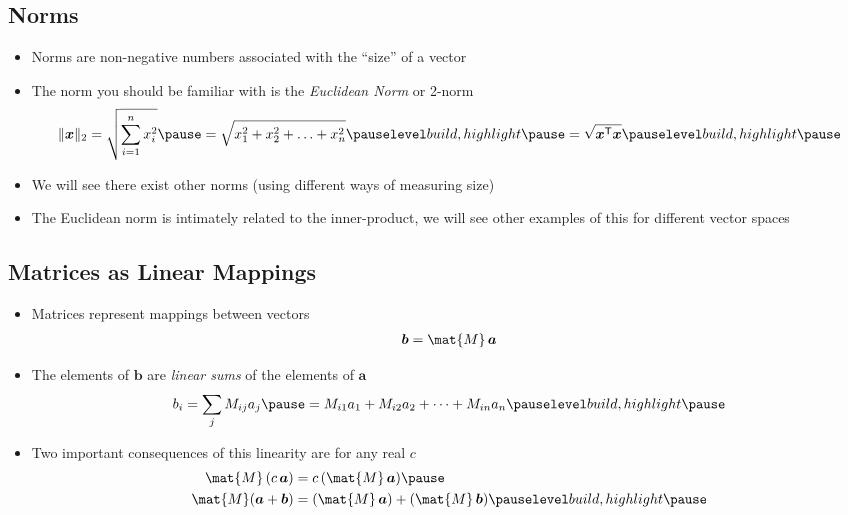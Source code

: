 \begin{slide}
\section[-2]{Norms}

\begin{PauseHighLight}
  \begin{itemize}
  \item Norms are non-negative numbers associated with the ``size'' of
    a vector\pause
  \item The norm you should be familiar with is the \emph{Euclidean
      Norm} or 2-norm
    \begin{align*}
      \|\bm{x}\|_2 = \sqrt{\sum_{i=1}^n x_i^2}\pause = \sqrt{x_1^2 +
      x_2^2 + \ldots + x_n^2}\pauseb = \sqrt{\bm{x}^\tr \bm{x}}\pauseb
    \end{align*}
  \item We will see there exist other norms (using different ways of
    measuring size)\pause
  \item The Euclidean norm is intimately related to the inner-product,
    we will see other examples of this for different vector spaces\pause
  \end{itemize}
\end{PauseHighLight}

\end{slide}


\begin{slide}
\section[-1]{Matrices as Linear Mappings}

\begin{PauseHighLight}
  \begin{itemize}
  \item Matrices represent mappings between vectors
    \begin{align*}
      \bm{b} = \mat{M}\, \bm{a} 
    \end{align*}
  \item The elements of $\bm{b}$ are \emph{linear sums} of the elements of
    $\bm{a}$
    \begin{align*}
      b_i = \sum_j M_{ij} a_j\pause = M_{i1} a_1 + M_{i2} a_2 + \cdots + M_{in} a_n\pauseb
    \end{align*}
  \item Two important consequences of this linearity are for any real
    $c$
    \begin{align*}
      \mat{M}\, (c\,\bm{a}) &= c\, (\mat{M}\, \bm{a}) \pause\\
      \mat{M} (\bm{a} + \bm{b}) &= (\mat{M}\, \bm{a}) + (\mat{M}\, \bm{b})\pauseb
    \end{align*}
  \end{itemize}
\end{PauseHighLight}

\end{slide}

